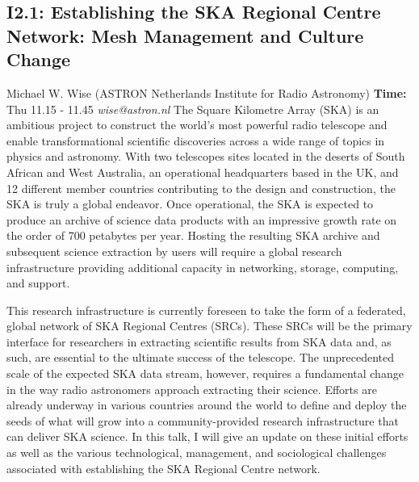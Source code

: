 \documentclass{report}
\begin{document}
\subsection*{I2.1: Establishing the SKA Regional Centre Network: Mesh Management and Culture Change}
\bigskip
Michael W. Wise (ASTRON Netherlands Institute for Radio Astronomy) \newline   \newline   \newline   \newline  \newline  \newline\newline
{\bf Time:} Thu 11.15 - 11.45\newline
\newline
{\it wise@astron.nl}\newline
\newline\newline
The Square Kilometre Array (SKA) is an ambitious project to construct the world’s most powerful radio telescope and enable transformational scientific discoveries across a wide range of topics in physics and astronomy. With two telescopes sites located in the deserts of South African and West Australia, an operational headquarters based in the UK, and 12 different member countries contributing to the design and construction, the SKA is truly a global endeavor. Once operational, the SKA is expected to produce an archive of science data products with an impressive growth rate on the order of 700 petabytes per year. Hosting the resulting SKA archive and subsequent science extraction by users will require a global research infrastructure providing additional capacity in networking, storage, computing, and support. 

This research infrastructure is currently foreseen to take the form of a federated, global network of SKA Regional Centres (SRCs). These SRCs will be the primary interface for researchers in extracting scientific results from SKA data and, as such, are essential to the ultimate success of the telescope. The unprecedented scale of the expected SKA data stream, however, requires a fundamental change in the way radio astronomers approach extracting their science. Efforts are already underway in various countries around the world to define and deploy the seeds of what will grow into a community-provided research infrastructure that can deliver SKA science. In this talk, I will give an update on these initial efforts as well as the various technological, management, and sociological challenges associated with establishing the SKA Regional Centre network.\newline
\newpage
\end{document}
